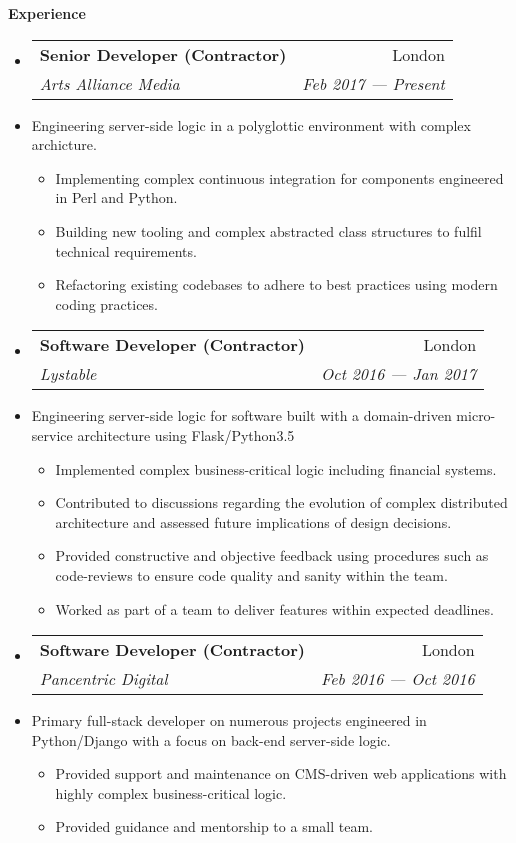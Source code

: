 \documentclass[letterpaper,11pt]{article}
\makeatletter
\newcommand{\resitem}[1]{\item #1 \vspace{-2pt}}
\newcommand{\resheading}[1]{{\large \colorbox{mygrey}
            {\begin{minipage}{\textwidth}
                {\textbf{#1 \vphantom{p\^{E}}}}
            \end{minipage}}}
    }
\newcommand{\ressubheading}[4]{
        \begin{tabular*}{180mm}{l@{\extracolsep{\fill}}r}
            \textbf{#1} & #2 \\
            \textit{#3} & \textit{#4} \\
        \end{tabular*}\vspace{-6pt}
    }
\newcommand{\resdescription}[1]{#1 \vspace{-0mm}}
\makeatother
\begin{document}
    \resheading{Experience}
    \begin{itemize}

        \item[]
            \ressubheading{Senior Developer (Contractor)}{London}{Arts Alliance Media}{Feb 2017 --- Present}
        \item[]
            \resdescription{Engineering server-side logic in a polyglottic environment with complex archicture.}
            \begin{itemize}
                    \resitem{Implementing complex continuous integration for components engineered in Perl and Python.}
                    \resitem{Building new tooling and complex abstracted class structures to fulfil technical requirements.}
                    \resitem{Refactoring existing codebases to adhere to best practices using modern coding practices.}
            \end{itemize}
        \item[]
            \ressubheading{Software Developer (Contractor)}{London}{Lystable}{Oct 2016 --- Jan 2017}
        \item[]
            \resdescription{Engineering server-side logic for software built with a domain-driven micro-service architecture using Flask/Python3.5}
            \begin{itemize}
                    \resitem{Implemented complex business-critical logic including financial systems.}
                    \resitem{Contributed to discussions regarding the evolution of complex distributed architecture and assessed future implications of design decisions.}
                    \resitem{Provided constructive and objective feedback using procedures such as code-reviews to ensure code quality and sanity within the team.}
                    \resitem{Worked as part of a team to deliver features within expected deadlines.}
            \end{itemize}
        \item[]
            \ressubheading{Software Developer (Contractor)}{London}{Pancentric Digital}{Feb 2016 --- Oct 2016}
        \item[]
            \resdescription{Primary full-stack developer on numerous projects engineered in Python/Django with a focus on back-end server-side logic.}
            \begin{itemize}
                    \resitem{Provided support and maintenance on CMS-driven web applications with highly complex business-critical logic.}
                    \resitem{Provided guidance and mentorship to a small team.}

\end{itemize}
\end{itemize}
\end{document}

